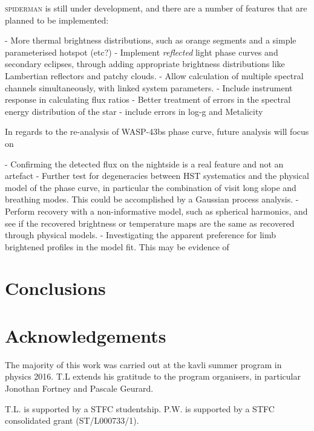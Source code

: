 \documentclass[a4paper,fleqn,usenatbib]{mnras}
\begin{document}
\textsc{spiderman} is still under development, and there are a number of features that are planned to be implemented:

- More thermal brightness distributions, such as orange segments and a simple parameterised hotspot (etc?)
- Implement \emph{reflected} light phase curves and secondary eclipses, through adding appropriate brightness distributions like Lambertian reflectors and patchy clouds.
- Allow calculation of multiple spectral channels simultaneously, with linked system parameters.
- Include instrument response in calculating flux ratios
- Better treatment of errors in the spectral energy distribution of the star - include errors in log-g and Metalicity

In regards to the re-analysis of WASP-43bs phase curve, future analysis will focus on

- Confirming the detected flux on the nightside is a real feature and not an artefact
- Further test for degeneracies between HST systematics and the physical model of the phase curve, in particular the combination of visit long slope and breathing modes. This could be accomplished by a Gaussian process analysis.
- Perform recovery with a non-informative model, such as spherical harmonics, and see if the recovered brightness or temperature maps are the same as recovered through physical models.
- Investigating the apparent preference for limb brightened profiles in the model fit. This may be evidence of

\section{Conclusions}

\section*{Acknowledgements}

The majority of this work was carried out at the kavli summer program in physics 2016. T.L extends his gratitude to the program organisers, in particular Jonothan Fortney and Pascale Geurard.

T.L. is supported by a STFC studentship. P.W. is supported by a STFC consolidated grant (ST/L000733/1).



\end{document}
